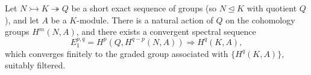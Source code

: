 Let $N \rightarrowtail K \twoheadrightarrow Q$ be a short exact sequence of groups (so $N \trianglelefteq K$ with quotient $Q$), and let $A$ be a $K$-module. There is a natural action of $Q$ on the cohomology groups $H^m(N, A)$, and there exists a convergent spectral sequence
$$E_1^{p,q} = H^p(Q, H^{q-p}(N, A)) \Longrightarrow H^q(K, A),$$
which converges finitely to the graded group associated with $\{H^q(K, A)\}$, suitably filtered.